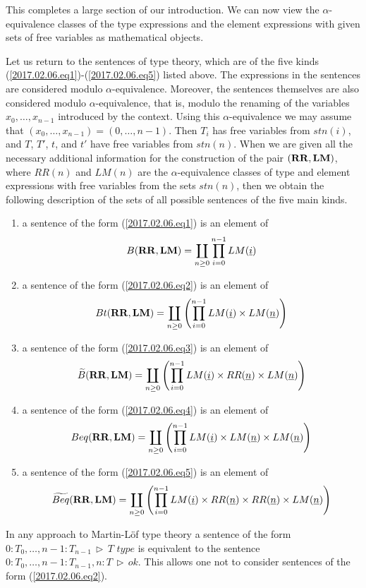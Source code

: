 \documentclass[12pt]{amsart}
\numberwithin{proposition}{subsection}
\newcommand{\uu}{\underline}
\newcommand{\wt}{\widetilde}
\newcommand{\RR}{{\bf RR}}
\newcommand{\LM}{{\bf LM}}
\DeclareMathOperator{\rh}{\,\rhd\,}
\newcommand{\type}{\,\,type}
\newcommand{\ff}[1]{\uu{#1}}
\begin{document}
This completes a large section of our introduction. We can now view the
$\alpha$-equivalence classes of the type expressions and the element expressions with given
sets of free variables as mathematical objects.

Let us return to the sentences of type theory, which are of the five kinds
(\ref{2017.02.06.eq1})-(\ref{2017.02.06.eq5}) listed above.  The expressions in the sentences
are considered modulo $\alpha$-equivalence. Moreover, the sentences
themselves are also considered modulo $\alpha$-equivalence, that is, modulo
the renaming of the variables $x_0,\dots,x_{n-1}$ introduced by the
context. Using this $\alpha$-equivalence we may assume that
$(x_0,\dots,x_{n-1})=(0,\dots,n-1)$. Then $T_i$ has free variables from
$stn(i)$, and $T$, $T'$, $t$, and $t'$ have free variables from $stn(n)$. When we are given
all the necessary additional information for the construction of the pair
$(\RR,\LM)$, where $RR(n)$ and $LM(n)$ are the $\alpha$-equivalence classes of
type and element expressions with free variables from the sets $stn(n)$, then we
obtain the following description of the sets of all possible sentences of the
five main kinds.
%
\begin{enumerate}
\item a sentence of the form (\ref{2017.02.06.eq1}) is an element of
%
$$B(\RR,\LM)=\coprod_{n\ge 0} \prod_{i=0}^{n-1}LM(\ff{i})$$
%
\item a sentence of the form (\ref{2017.02.06.eq2}) is an element of
%
$$Bt(\RR,\LM)=\coprod_{n\ge 0} \left(\prod_{i=0}^{n-1}LM(\ff{i})\times LM(\ff{n})\right)$$
%
\item a sentence of the form (\ref{2017.02.06.eq3}) is an element of
%
$$\wt{B}(\RR,\LM)=\coprod_{n\ge 0} \left(\prod_{i=0}^{n-1}LM(\ff{i})\times RR(\ff{n})\times LM(\ff{n})\right)$$
%
\item a sentence of the form (\ref{2017.02.06.eq4}) is an element of
%
$$Beq(\RR,\LM)=\coprod_{n\ge 0} \left(\prod_{i=0}^{n-1}LM(\ff{i})\times LM(\ff{n})\times LM(\ff{n})\right)$$
%
\item a sentence of the form (\ref{2017.02.06.eq5}) is an element of
%
$$\wt{Beq}(\RR,\LM)=\coprod_{n\ge 0} \left(\prod_{i=0}^{n-1}LM(\ff{i})\times RR(\ff{n})\times RR(\ff{n})\times LM(\ff{n})\right)$$
%
\end{enumerate}
%
In any approach to Martin-L\"of type theory a sentence of the form
$0:T_0,\dots,n-1:T_{n-1}\rh T\type$ is equivalent to the sentence $0:T_0,\dots,
n-1:T_{n-1},n:T\rh ok$. This allows one not to consider sentences of the form
(\ref{2017.02.06.eq2}).
\end{document}
